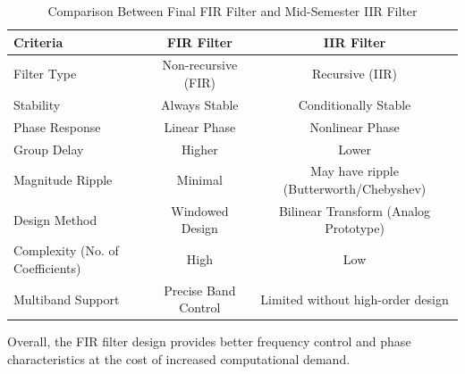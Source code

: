 \documentclass[12pt]{article}
\begin{document}
\begin{table}[H]
    \centering
    \begin{tabular}{|p{5cm}|c|c|}
        \hline
        \textbf{Criteria} & \textbf{FIR Filter} & \textbf{IIR Filter} \\
        \hline
        Filter Type & Non-recursive (FIR) & Recursive (IIR) \\
        Stability & Always Stable & Conditionally Stable \\
        Phase Response & Linear Phase & Nonlinear Phase \\
        Group Delay & Higher & Lower \\
        Magnitude Ripple & Minimal & May have ripple (Butterworth/Chebyshev) \\
        Design Method & Windowed Design & Bilinear Transform (Analog Prototype) \\
        Complexity (No. of Coefficients) & High & Low \\
        Multiband Support & Precise Band Control & Limited without high-order design \\
        \hline
    \end{tabular}
    \caption{Comparison Between Final FIR Filter and Mid-Semester IIR Filter}
    \label{tab:fir_vs_iir_comparison}
\end{table}

Overall, the FIR filter design provides better frequency control and phase characteristics at the cost of increased computational demand.
\end{document}
